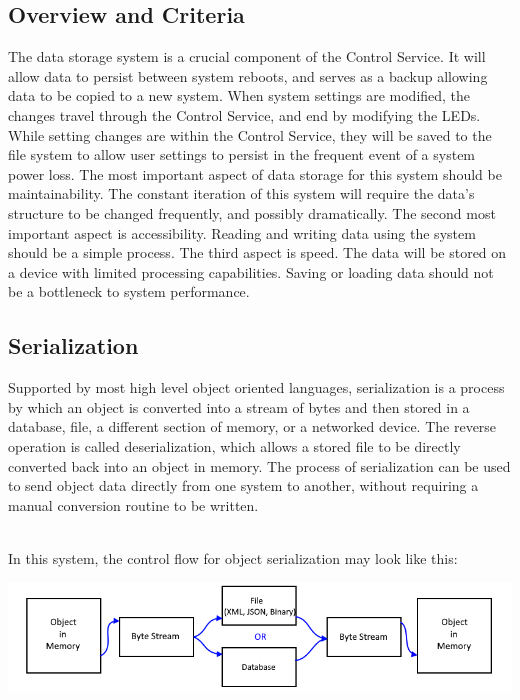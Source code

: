 \documentclass[onecolumn, draftclsnofoot,10pt, compsoc]{IEEEtran}
\begin{document}
		\subsection{Overview and Criteria}
		The data storage system is a crucial component of the Control Service.
		It will allow data to persist between system reboots, and serves as a backup allowing data to be copied to a new system.
		When system settings are modified, the changes travel through the Control Service, and end by modifying the LEDs.
		While setting changes are within the Control Service, they will be saved to the file system to allow user settings to persist in the frequent event of a system power loss.
		The most important aspect of data storage for this system should be maintainability.
		The constant iteration of this system will require the data's structure to be changed frequently, and possibly dramatically.
		The second most important aspect is accessibility. Reading and writing data using the system should be a simple process.
	  The third aspect is speed. The data will be stored on a device with limited processing capabilities. Saving or loading data should not be a bottleneck to system performance.

		\subsection{Serialization}
		Supported by most high level object oriented languages, serialization is a process by which an object is converted into a stream of bytes and then stored in a database, file, a different section of memory, or a networked device. \cite{serialization1}
		The reverse operation is called deserialization, which allows a stored file to be directly converted back into an object in memory.
		The process of serialization can be used to send object data directly from one system to another, without requiring a manual conversion routine to be written.

		\noindent \\In this system, the control flow for object serialization may look like this:

		\includegraphics[width=\linewidth]{serializationDiag.png}
\end{document}
